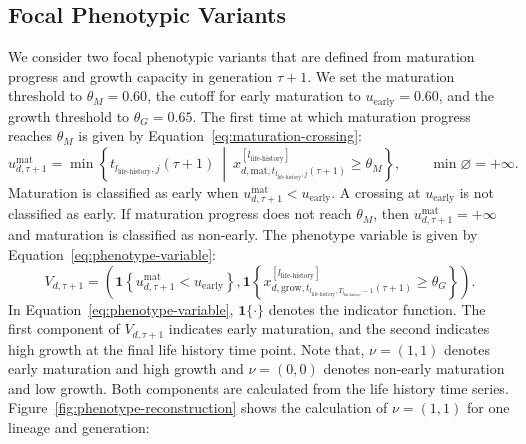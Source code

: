 \documentclass[11pt]{article}
\begin{document}
\subsection{Focal Phenotypic Variants}
We consider two focal phenotypic variants that are defined from maturation progress and growth capacity in generation $\tau+1$. We set the maturation threshold to $\theta_M=0.60$, the cutoff for early maturation to $u_{\mathrm{early}}=0.60$, and the growth threshold to $\theta_G=0.65$. The first time at which maturation progress reaches $\theta_M$ is given by Equation~\ref{eq:maturation-crossing}:
\begin{equation}
u^{\mathrm{mat}}_{d,\tau+1}
=
\min
\left\{
t_{l_{\mathrm{life\text{-}history}},j}(\tau+1)
\ \middle|\
x^{[l_{\mathrm{life\text{-}history}}]}_
{d,\mathrm{mat},
t_{l_{\mathrm{life\text{-}history}},j}(\tau+1)}
\geq
\theta_M
\right\},
\qquad
\min\varnothing=+\infty.
\label{eq:maturation-crossing}
\end{equation}
Maturation is classified as early when $u^{\mathrm{mat}}_{d,\tau+1}<u_{\mathrm{early}}$. A crossing at $u_{\mathrm{early}}$ is not classified as early. If maturation progress does not reach $\theta_M$, then $u^{\mathrm{mat}}_{d,\tau+1}=+\infty$ and maturation is classified as non-early. The phenotype variable is given by Equation~\ref{eq:phenotype-variable}:
\begin{equation}
V_{d,\tau+1}
=
\left(
\mathbf{1}
\left\{
u^{\mathrm{mat}}_{d,\tau+1}
<
u_{\mathrm{early}}
\right\},
\mathbf{1}
\left\{
x^{[l_{\mathrm{life\text{-}history}}]}_
{d,\mathrm{grow},
t_{l_{\mathrm{life\text{-}history}},
T_{l_{\mathrm{life\text{-}history}}}-1}(\tau+1)}
\geq
\theta_G
\right\}
\right).
\label{eq:phenotype-variable}
\end{equation}
In Equation~\ref{eq:phenotype-variable}, $\mathbf{1}\{\cdot\}$ denotes the indicator function. The first component of $V_{d,\tau+1}$ indicates early maturation, and the second indicates high growth at the final life history time point. Note that, $\nu=(1,1)$ denotes early maturation and high growth and $\nu=(0,0)$ denotes non-early maturation and low growth. Both components are calculated from the life history time series. Figure~\ref{fig:phenotype-reconstruction} shows the calculation of $\nu=(1,1)$ for one lineage and generation:
\end{document}
